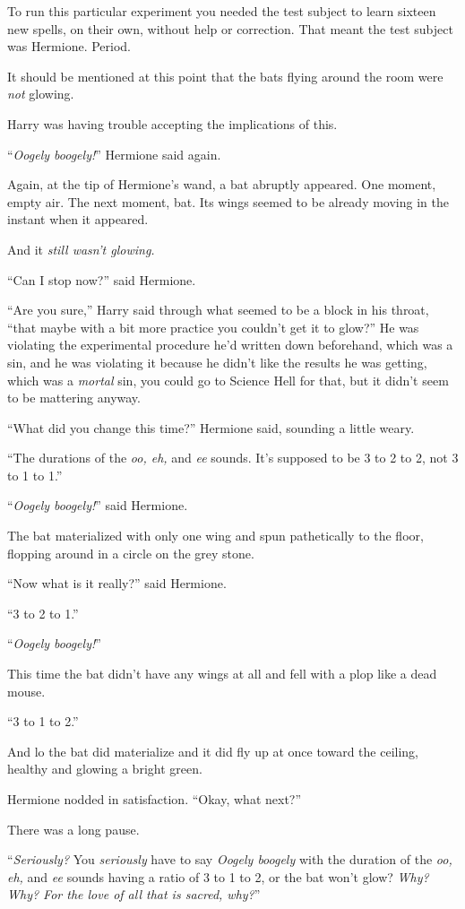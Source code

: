 To run this particular experiment you needed the test subject to learn sixteen new spells, on their own, without help or correction. That meant the test subject was Hermione. Period.

It should be mentioned at this point that the bats flying around the room were \emph{not} glowing.

Harry was having trouble accepting the implications of this.

“\emph{Oogely boogely!}” Hermione said again.

Again, at the tip of Hermione’s wand, a bat abruptly appeared. One moment, empty air. The next moment, bat. Its wings seemed to be already moving in the instant when it appeared.

And it \emph{still wasn’t glowing.}

“Can I stop now?” said Hermione.

“Are you sure,” Harry said through what seemed to be a block in his throat, “that maybe with a bit more practice you couldn’t get it to glow?” He was violating the experimental procedure he’d written down beforehand, which was a sin, and he was violating it because he didn’t like the results he was getting, which was a \emph{mortal} sin, you could go to Science Hell for that, but it didn’t seem to be mattering anyway.

“What did you change this time?” Hermione said, sounding a little weary.

“The durations of the \emph{oo, eh,} and \emph{ee} sounds. It’s supposed to be 3 to 2 to 2, not 3 to 1 to 1.”

“\emph{Oogely boogely!}” said Hermione.

The bat materialized with only one wing and spun pathetically to the floor, flopping around in a circle on the grey stone.

“Now what is it really?” said Hermione.

“3 to 2 to 1.”

“\emph{Oogely boogely!}”

This time the bat didn’t have any wings at all and fell with a plop like a dead mouse.

“3 to 1 to 2.”

And lo the bat did materialize and it did fly up at once toward the ceiling, healthy and glowing a bright green.

Hermione nodded in satisfaction. “Okay, what next?”

There was a long pause.

“\emph{Seriously?} You \emph{seriously} have to say \emph{Oogely boogely} with the duration of the \emph{oo, eh,} and \emph{ee} sounds having a ratio of 3 to 1 to 2, or the bat won’t glow? \emph{Why? Why? For the love of all that is sacred, why?}”

